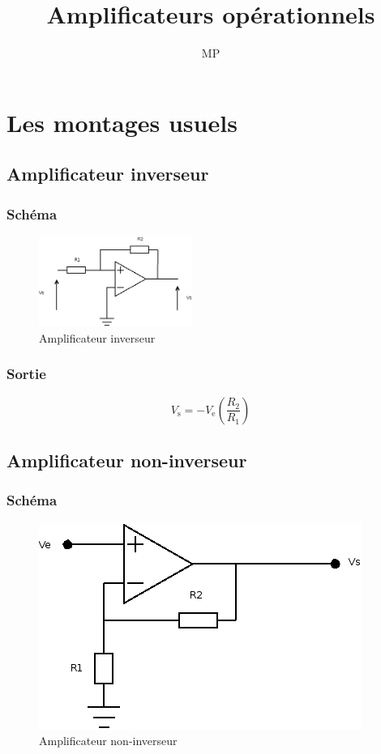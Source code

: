 \documentclass[a4paper,12 pt,oneside]{report}     %
\title{Amplificateurs opérationnels}
\author{MP}
\begin{document}
\maketitle
\tableofcontents
\chapter{Les montages usuels}
\section{Amplificateur inverseur}
\subsection{Schéma}
\begin{figure}[!h]
  \centering
  \includegraphics[width=5cm]{ampliopinverseur.png}
  \caption{Amplificateur inverseur}
\end{figure}
\subsection{Sortie}
$$ V_\mathrm{s} = - V_\mathrm{e} \left ( \dfrac{R_\mathrm{2}}{R_\mathrm{1}} \right)$$
\section{Amplificateur non-inverseur}
\subsection{Schéma}
\begin{figure}
  \includegraphics{ampliopnoninverseur.png}
  \caption{Amplificateur non-inverseur}
\end{figure}
\end{document}
